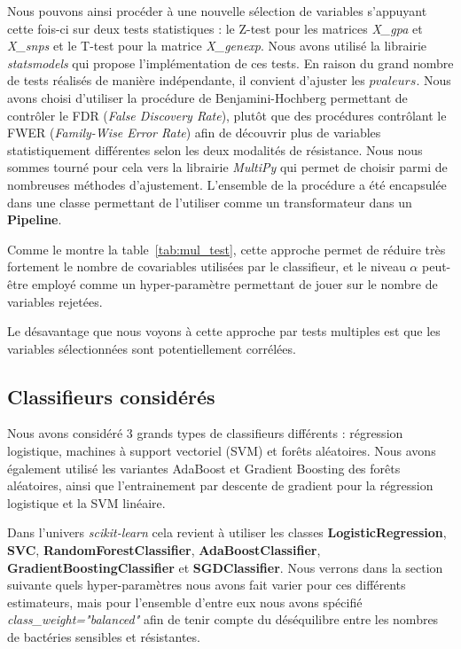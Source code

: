 \documentclass[11pt]{article}
\begin{document}
  Nous pouvons ainsi procéder à une nouvelle sélection de variables s'appuyant cette fois-ci sur deux tests statistiques : le Z-test pour les matrices \textit{X\_gpa} et \textit{X\_snps} et le T-test pour la matrice \textit{X\_genexp}.
  Nous avons utilisé la librairie \textit{statsmodels} qui propose l'implémentation de ces tests.
  En raison du grand nombre de tests réalisés de manière indépendante, il convient d'ajuster les $pvaleurs$.
  Nous avons choisi d'utiliser la procédure de Benjamini-Hochberg permettant de contrôler le FDR (\textit{False Discovery Rate}), plutôt que des procédures contrôlant le FWER (\textit{Family-Wise Error Rate}) afin de découvrir plus de variables statistiquement différentes selon les deux modalités de résistance.
  Nous nous sommes tourné pour cela vers la librairie \textit{MultiPy} qui permet de choisir parmi de nombreuses méthodes d'ajustement.
  L'ensemble de la procédure a été encapsulée dans une classe permettant de l'utiliser comme un transformateur dans un \textbf{Pipeline}.

  Comme le montre la table~\ref{tab:mul_test}, cette approche permet de réduire très fortement le nombre de covariables utilisées par le classifieur, et le niveau $\alpha$ peut-être employé comme un hyper-paramètre permettant de jouer sur le nombre de variables rejetées.

  

  Le désavantage que nous voyons à cette approche par tests multiples est que les variables sélectionnées sont potentiellement corrélées.

\hypertarget{classifieurs-consideres}{%
\subsection{Classifieurs considérés}\label{classifieurs-consideres}}

  Nous avons considéré 3 grands types de classifieurs différents : régression logistique, machines à support vectoriel (SVM) et forêts aléatoires.
  Nous avons également utilisé les variantes AdaBoost et Gradient Boosting des forêts aléatoires, ainsi que l'entrainement par descente de gradient pour la régression logistique et la SVM linéaire.

  Dans l'univers \textit{scikit-learn} cela revient à utiliser les classes \textbf{LogisticRegression}, \textbf{SVC}, \textbf{RandomForestClassifier}, \textbf{AdaBoostClassifier}, \textbf{GradientBoostingClassifier} et \textbf{SGDClassifier}.
  Nous verrons dans la section suivante quels hyper-paramètres nous avons fait varier pour ces différents estimateurs, mais pour l'ensemble d'entre eux nous avons spécifié \textit{class\_weight="balanced"} afin de tenir compte du déséquilibre entre les nombres de bactéries sensibles et résistantes.
\end{document}
